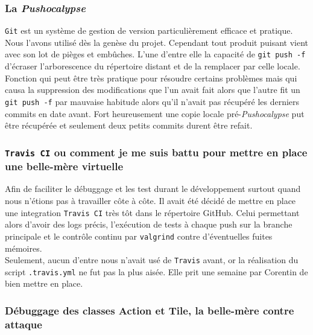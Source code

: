 \documentclass{article}
\newcommand{\info}{\texttt}
\begin{document}
        \subsubsection{La \emph{Pushocalypse}}
        
        \info{Git} est un système de gestion de version particulièrement efficace et pratique. Nous l'avons utilisé dès la genèse du projet. Cependant tout produit puisant vient avec son lot de pièges et embûches. L'une d'entre elle la capacité de \info{git push -f} d'écraser l'arborescence du répertoire distant et de la remplacer par celle locale. Fonction qui peut être très pratique pour résoudre certains problèmes mais qui causa la suppression des modifications que l'un avait fait alors que l'autre fit un \info{git push -f} par mauvaise habitude alors qu'il n'avait pas récupéré les derniers commits en date avant. Fort heureusement une copie locale pré-\emph{Pushocalypse} put être récupérée et seulement deux petits commits durent être refait.
        
        \subsubsection{\info{Travis CI} ou comment je me suis battu pour mettre en place une belle-mère virtuelle}
        
        Afin de faciliter le débuggage et les test durant le développement surtout quand nous n'étions pas à travailler côte à côte. Il avait été décidé de mettre en place une integration \info{Travis CI} très tôt dans le répertoire GitHub. Celui permettant alors d'avoir des logs précis, l'exécution de tests à chaque push sur la branche principale et le contrôle continu par \info{valgrind} contre d'éventuelles fuites mémoires.\\
        Seulement, aucun d'entre nous n'avait usé de \info{Travis} avant, or la réalisation du script \info{.travis.yml} ne fut pas la plus aisée. Elle prit une semaine par Corentin de bien mettre en place.
        
        \subsubsection{Débuggage des classes Action et Tile, la belle-mère contre attaque}
        
\end{document}
